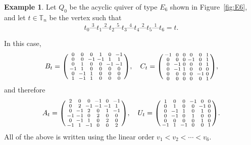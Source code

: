 \documentclass[11pt, letterpaper]{amsart}
\theoremstyle{definition}
\newtheorem{example}[theorem]{Example}
\numberwithin{equation}{section}
\newcommand{\Qinit}{Q_0}
\begin{document}
\begin{example}
\label{eg:E6}
Let $\Qinit$ be the acyclic quiver of type $E_6$ shown in Figure~\ref{fig:E6}, and let $t \in \mathbb T_n$ be the vertex such that 
$$ t_0 \stackrel{3}{\text{---}} t_1 \stackrel{2}{\text{---}} t_2 \stackrel{5}{\text{---}} t_3 \stackrel{4}{\text{---}} t_4 \stackrel{2}{\text{---}} t_5 \stackrel{1}{\text{---}} t_6=t.$$ 

In this case,
$$ B_t = \begin{psmallmatrix}
0 & 0 & 0 & 1 & 0 & -1 \\
0 & 0 & -1 & -1 & 1 & 1 \\
0 & 1 & 0 & 0 & -1 & -1 \\
-1 & 1 & 0 & 0 & 0 & 0 \\
0 & -1 & 1 & 0 & 0 & 0 \\
1 & -1 & 1 & 0 & 0 & 0
\end{psmallmatrix}, \quad C_t = 
\begin{psmallmatrix}
-1 & 0 & 0 & 0 & 0 & 1 \\
0 & 0 & 0 & -1 & 0 & 1 \\
0 & -1 & 0 & 0 & 0 & 1 \\
0 & -1 & 1 & 0 & 0 & 0 \\
0 & 0 & 0 & 0 & -1 & 0 \\
0 & 0 & 0 & 0 & 0 & 1
\end{psmallmatrix},$$
and therefore %
$$A_t = \begin{psmallmatrix}
2 & 0 & 0 & -1 & 0 & -1 \\
0 & 2 & -1 & -1 & -1 & 1 \\
0 & -1 & 2 & 0 & 1 & -1 \\
-1 & -1 & 0 & 2 & 0 & 0 \\
0 & -1 & 1 & 0 & 2 & 0 \\
-1 & 1 & -1 & 0 & 0 & 2
\end{psmallmatrix}, \quad U_t = \begin{psmallmatrix}
1 & 0 & 0 & -1 & 0 & 0 \\
0 & 1 & 0 & 0 & -1 & 0 \\
0 & -1 & 1 & 0 & 1 & 0 \\
0 & -1 & 0 & 1 & 0 & 0 \\
0 & 0 & 0 & 0 & 1 & 0 \\
-1 & 1 & -1 & 0 & 0 & 1
\end{psmallmatrix}.$$
All of the above is written using the linear order $v_1 < v_2 < \cdots < v_6$.
\end{example} 
\end{document}
